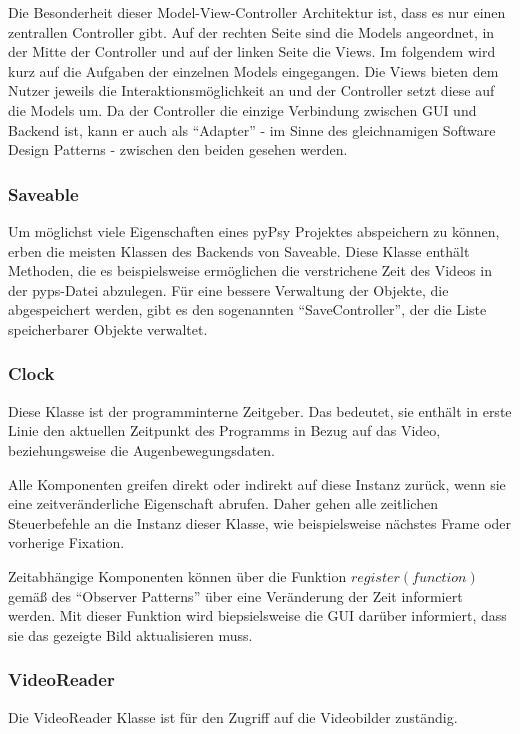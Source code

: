 \documentclass[a4paper,draft]{scrartcl}
\begin{document}
  Die Besonderheit dieser Model-View-Controller Architektur ist, dass es nur einen zentrallen Controller gibt. Auf der rechten Seite sind die Models angeordnet, in der Mitte der Controller und auf der linken Seite die Views. Im folgendem wird kurz auf die Aufgaben der einzelnen Models eingegangen. Die Views bieten dem Nutzer jeweils die Interaktionsmöglichkeit an und der Controller setzt diese auf die Models um. Da der Controller die einzige Verbindung zwischen GUI und Backend ist, kann er auch als "`Adapter"' - im Sinne des gleichnamigen Software Design Patterns - zwischen den beiden gesehen werden. 

\subsubsection{Saveable}
Um möglichst viele Eigenschaften eines pyPsy Projektes abspeichern zu können, erben die meisten Klassen des Backends von Saveable. Diese Klasse enthält Methoden, die es beispielsweise ermöglichen die verstrichene Zeit des Videos in der pyps-Datei abzulegen. 
Für eine bessere Verwaltung der Objekte, die abgespeichert werden, gibt es den sogenannten "`SaveController"', der die Liste speicherbarer Objekte verwaltet. 

\subsubsection{Clock}
Diese Klasse ist der programminterne Zeitgeber. 
Das bedeutet, sie enthält in erste Linie den aktuellen Zeitpunkt des Programms in Bezug auf das Video, beziehungsweise die Augenbewegungsdaten.

Alle Komponenten greifen direkt oder indirekt auf diese Instanz zurück, wenn sie eine zeitveränderliche Eigenschaft abrufen. Daher gehen alle zeitlichen Steuerbefehle an die Instanz dieser Klasse, wie beispielsweise nächstes Frame oder vorherige Fixation. 

Zeitabhängige Komponenten können über die Funktion $register(function)$ gemäß des "`Observer Patterns"' über eine Veränderung der Zeit informiert werden.
Mit dieser Funktion wird biepsielsweise die GUI darüber informiert, dass sie das gezeigte Bild aktualisieren muss.

\subsubsection{VideoReader}
Die VideoReader Klasse ist für den Zugriff auf die Videobilder zuständig.
\end{document}
